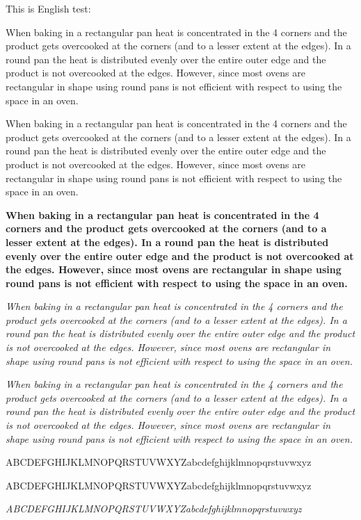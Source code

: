 \documentclass[shorttitle,oneside]{NJUbachelor}
\begin{document}
\noindent
This is English test:

When baking in a rectangular pan heat is concentrated in the 4 corners and the product gets overcooked at the corners (and to a lesser extent at the edges). In a round pan the heat is distributed evenly over the entire outer edge and the product is not overcooked at the edges. However, since most ovens are rectangular in shape using round pans is not efficient with respect to using the space in an oven.

\sf
When baking in a rectangular pan heat is concentrated in the 4 corners and the product gets overcooked at the corners (and to a lesser extent at the edges). In a round pan the heat is distributed evenly over the entire outer edge and the product is not overcooked at the edges. However, since most ovens are rectangular in shape using round pans is not efficient with respect to using the space in an oven.

\bf
When baking in a rectangular pan heat is concentrated in the 4 corners and the product gets overcooked at the corners (and to a lesser extent at the edges). In a round pan the heat is distributed evenly over the entire outer edge and the product is not overcooked at the edges. However, since most ovens are rectangular in shape using round pans is not efficient with respect to using the space in an oven.

\it
When baking in a rectangular pan heat is concentrated in the 4 corners and the product gets overcooked at the corners (and to a lesser extent at the edges). In a round pan the heat is distributed evenly over the entire outer edge and the product is not overcooked at the edges. However, since most ovens are rectangular in shape using round pans is not efficient with respect to using the space in an oven.

\sl
When baking in a rectangular pan heat is concentrated in the 4 corners and the product gets overcooked at the corners (and to a lesser extent at the edges). In a round pan the heat is distributed evenly over the entire outer edge and the product is not overcooked at the edges. However, since most ovens are rectangular in shape using round pans is not efficient with respect to using the space in an oven.

\rm
ABCDEFGHIJKLMNOPQRSTUVWXYZabcdefghijklmnopqrstuvwxyz

\sf
ABCDEFGHIJKLMNOPQRSTUVWXYZabcdefghijklmnopqrstuvwxyz

\it
ABCDEFGHIJKLMNOPQRSTUVWXYZabcdefghijklmnopqrstuvwxyz
\end{document}
